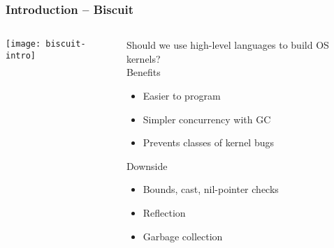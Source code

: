 \begin{frame}[plain]
	\frametitle{Introduction -- Biscuit}
	
	
	
	\begin{columns}
		
		\begin{column}{.5\textwidth}
			
			\texttt{[image: biscuit-intro]}
			
		\end{column}
		
		\begin{column}{.5\textwidth}
			
			\Large
		Should we use high-level languages to build
		OS kernels? \\
		
			\normalsize
			Benefits
			\begin{itemize}
				\item Easier to program
				\item Simpler concurrency with GC
				\item Prevents classes of kernel bugs	
			\end{itemize}
			
			Downside
			\begin{itemize}
				\item Bounds, cast, nil-pointer checks
				\item Reflection
				\item Garbage collection	
			\end{itemize}
		\end{column}
		
		
	\end{columns}
	
	
\end{frame}


